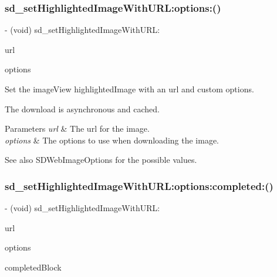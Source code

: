 \subsubsection{\texorpdfstring{sd\+\_\+set\+Highlighted\+Image\+With\+U\+R\+L\+:options\+:()}{sd\_setHighlightedImageWithURL:options:()}\hspace{0.1cm}{\footnotesize\ttfamily [3/3]}}
{\footnotesize\ttfamily -\/ (void) sd\+\_\+set\+Highlighted\+Image\+With\+U\+R\+L\+: \begin{DoxyParamCaption}\item[{(N\+S\+U\+RL $\ast$)}]{url }\item[{options:(S\+D\+Web\+Image\+Options)}]{options }\end{DoxyParamCaption}}

Set the image\+View {\ttfamily highlighted\+Image} with an {\ttfamily url} and custom options.

The download is asynchronous and cached.


\begin{DoxyParams}{Parameters}
{\em url} & The url for the image. \\
\hline
{\em options} & The options to use when downloading the image. \\
\hline
\end{DoxyParams}
\begin{DoxySeeAlso}{See also}
S\+D\+Web\+Image\+Options for the possible values. 
\end{DoxySeeAlso}
\mbox{\label{category_u_i_image_view_07_highlighted_web_cache_08_a3bbfcd1433513161520293acac8f9fff}} 
\subsubsection{\texorpdfstring{sd\+\_\+set\+Highlighted\+Image\+With\+U\+R\+L\+:options\+:completed\+:()}{sd\_setHighlightedImageWithURL:options:completed:()}\hspace{0.1cm}{\footnotesize\ttfamily [1/3]}}
{\footnotesize\ttfamily -\/ (void) sd\+\_\+set\+Highlighted\+Image\+With\+U\+R\+L\+: \begin{DoxyParamCaption}\item[{(N\+S\+U\+RL $\ast$)}]{url }\item[{options:(S\+D\+Web\+Image\+Options)}]{options }\item[{completed:(S\+D\+Web\+Image\+Completion\+Block)}]{completed\+Block }\end{DoxyParamCaption}}

